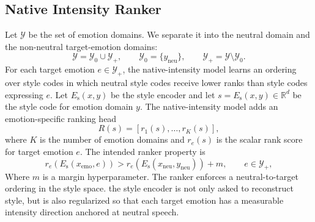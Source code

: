 \subsection{Native Intensity Ranker}
Let $\mathcal{Y}$ be the set of emotion domains.
We separate it into the neutral domain and the non-neutral target-emotion domains:
\begin{equation}
\mathcal{Y}=\mathcal{Y}_{0}\cup\mathcal{Y}_{+},\qquad
\mathcal{Y}_{0}=\{y_{\mathrm{neu}}\},\qquad
\mathcal{Y}_{+}=\mathcal{Y}\setminus\mathcal{Y}_{0}.
\end{equation}
For each target emotion $e\in\mathcal{Y}_{+}$, the native-intensity model learns an ordering over style codes in which neutral style codes receive lower ranks than style codes expressing $e$.
Let $E_{\text{s}}(x,y)$ be the style encoder and let $s=E_{\text{s}}(x,y)\in\mathbb{R}^{d}$ be the style code for emotion domain $y$.
The native-intensity model adds an emotion-specific ranking head 
\begin{equation}
R(s)=\left[r_1(s),\ldots,r_K(s)\right],
\end{equation}
where $K$ is the number of emotion domains and $r_e(s)$ is the scalar rank score for target emotion $e$.
The intended ranker property is
\begin{equation}
r_e\!\left(E_{\text{s}}(x_{\mathrm{emo}},e)\right)
>
r_e\!\left(E_{\text{s}}(x_{\mathrm{neu}},y_{\mathrm{neu}})\right) + m,
\qquad e\in\mathcal{Y}_{+} ,
\end{equation}
Where $m$ is a margin hyperparameter. The ranker enforces a neutral-to-target ordering in the style space. the style encoder is not only asked to reconstruct style, but is also regularized so that each target emotion has a measurable intensity direction anchored at neutral speech.

